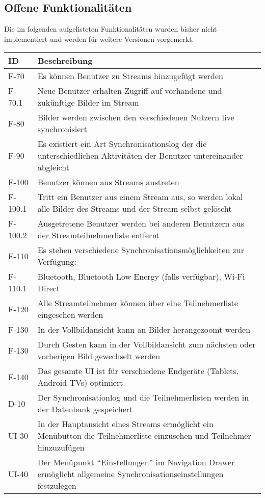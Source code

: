\subsection{Offene Funktionalitäten}
Die im folgenden aufgelisteten Funktionalitäten wurden bisher nicht implementiert und werden für weitere Versionen vorgemerkt.
\begin{center}
\begin{longtable}{|l|p{12cm}|}
\toprule
\textbf{ID} & \textbf{Beschreibung} \\
\hline
\endhead
\hline
\endfoot
F-70 & Es können Benutzer zu Streams hinzugefügt werden\\
F-70.1 & Neue Benutzer erhalten Zugriff auf vorhandene und zukünftige Bilder im Stream\\
F-80 & Bilder werden zwischen den verschiedenen Nutzern live synchronisiert\\
F-90 & Es existiert ein Art Synchronisationslog der die unterschiedlichen Aktivitäten der Benutzer untereinander abgleicht\\
F-100 & Benutzer können aus Streams austreten \\
F-100.1 & Tritt ein Benutzer aus einem Stream aus, so werden lokal alle Bilder des Streams und der Stream selbst gelöscht\\
F-100.2 & Ausgetretene Benutzer werden bei anderen Benutzern aus der Streamteilnehmerliste entfernt\\
F-110 & Es stehen verschiedene Synchronisationsmöglichkeiten zur Verfügung:\\
F-110.1 & Bluetooth, Bluetooth Low Energy (falls verfügbar), Wi-Fi Direct\\
F-120 & Alle Streamteilnehmer können über eine Teilnehmerliste eingesehen werden\\
F-130 & In der Vollbildansicht kann an Bilder herangezoomt werden\\
F-130 & Durch Gesten kann in der Vollbildansicht zum nächsten oder vorherigen Bild gewechselt werden\\
F-140 & Das gesamte UI ist für verschiedene Endgeräte (Tablets, Android TVs) optimiert\\
\hline
D-10 & Der Synchronisationlog und die Teilnehmerlisten werden in der Datenbank gespeichert\\
\hline
UI-30 & In der Hauptansicht eines Streams ermöglicht ein Menübutton die Teilnehmerliste einzusehen und Teilnehmer hinzuzufügen\\
UI-40 & Der Menüpunkt \enquote{Einstellungen} im Navigation Drawer ermöglicht allgemeine Synchronisationseinstellungen festzulegen\\
\end{longtable}
\end{center}
